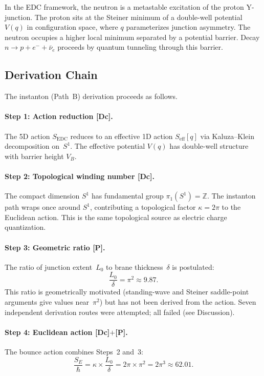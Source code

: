 \documentclass[12pt,a4paper]{article}
\theoremstyle{definition}
\theoremstyle{remark}
\newcommand{\tagDc}{\textsf{[Dc]}}
\newcommand{\tagP}{\textsf{[P]}}
\begin{document}
In the EDC framework, the neutron is a metastable excitation of the
proton Y-junction.  The proton sits at the Steiner minimum of a
double-well potential $V(q)$ in configuration space, where $q$
parameterizes junction asymmetry.  The neutron occupies a higher
local minimum separated by a potential barrier.  Decay
$n \to p + e^- + \bar\nu_e$ proceeds by quantum tunneling through
this barrier.

\subsection{Derivation Chain}

The instanton (Path~B) derivation proceeds as follows.

\paragraph{Step 1: Action reduction \tagDc.}
The 5D action $S_{\mathrm{EDC}}$ reduces to an effective 1D action
$S_{\mathrm{eff}}[q]$ via Kaluza--Klein decomposition on~$S^1$.
The effective potential $V(q)$ has double-well structure with barrier
height $V_B$.

\paragraph{Step 2: Topological winding number \tagDc.}
The compact dimension $S^1$ has fundamental group
$\pi_1(S^1) = \mathbb{Z}$.  The instanton path wraps once around
$S^1$, contributing a topological factor $\kappa = 2\pi$ to the
Euclidean action.  This is the same topological source as electric
charge quantization.

\paragraph{Step 3: Geometric ratio \tagP.}
The ratio of junction extent~$L_0$ to brane thickness~$\delta$ is
postulated:
\begin{equation}
  \frac{L_0}{\delta} = \pi^2 \approx 9.87.
  \label{eq:L0delta}
\end{equation}
This ratio is geometrically motivated (standing-wave and Steiner
saddle-point arguments give values near~$\pi^2$) but has not been
derived from the action.  Seven independent derivation routes were
attempted; all failed (see Discussion).

\paragraph{Step 4: Euclidean action \tagDc$+$\tagP.}
The bounce action combines Steps~2 and~3:
\begin{equation}
  \frac{S_E}{\hbar}
    = \kappa \times \frac{L_0}{\delta}
    = 2\pi \times \pi^2
    = 2\pi^3
    \approx 62.01.
  \label{eq:SE}
\end{equation}
\end{document}
